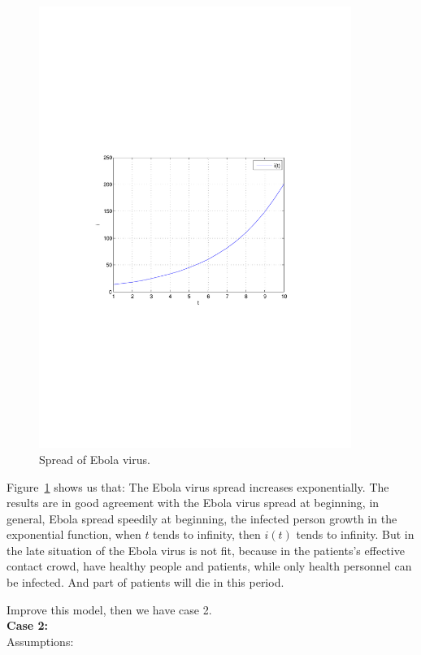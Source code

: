 \begin{figure}
\centering
\includegraphics[width=4in]{imgs/i(t).pdf}
\caption{Spread of Ebola virus.}
\label{fig:1}
\end{figure}
Figure~\ref{fig:1} shows us that: 
The Ebola virus spread increases exponentially.
The results are in good agreement with 
the Ebola virus spread at beginning, in general, Ebola
spread speedily at beginning, the infected person growth in the
exponential function, when $t$ tends to infinity, then $i(t)$
tends to infinity. But in the late situation of the Ebola virus
is not fit, because in the patients's effective
contact crowd, have healthy people and patients, while only
health personnel can be infected. And part of patients will die
in this period.\par
Improve this model, then we have case 2.\\
\textbf{Case 2:}\\
Assumptions:
